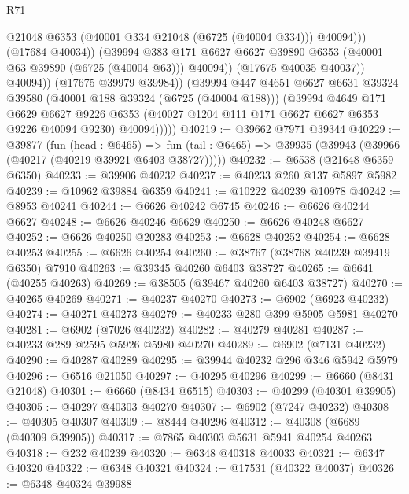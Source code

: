 \begin{lexlean}{R71}
\begin{coremodule}
                            @21048
                            @6353
                            (@40001 @334 @21048 (@6725 (@40004 @334)))
                            @40094)))
                      (@17684 @40034))
                    (@39994
                      @383
                      @171
                      @6627
                      @6627
                      @39890
                      @6353
                      (@40001 @63 @39890 (@6725 (@40004 @63)))
                      @40094))
                  (@17675 @40035 @40037))
                @40094))
            (@17675 @39979 @39984))
          (@39994
            @447
            @4651
            @6627
            @6631
            @39324
            @39580
            (@40001 @188 @39324 (@6725 (@40004 @188)))
            (@39994
              @4649
              @171
              @6629
              @6627
              @9226
              @6353
              (@40027 @1204 @111 @171 @6627 @6627 @6353 @9226 @40094 @9230)
              @40094)))))
@40219 := @39662 @7971 @39344
@40229 := @39877
    (fun (head : @6465) =>
    fun (tail : @6465) => @39935 (@39943 (@39966 (@40217 (@40219 @39921 @6403 @38727)))))
@40232 := @6538 (@21648 @6359 @6350)
@40233 := @39906 @40232
@40237 := @40233 @260 @137 @5897 @5982
@40239 := @10962 @39884 @6359
@40241 := @10222 @40239 @10978
@40242 := @8953 @40241
@40244 := @6626 @40242 @6745
@40246 := @6626 @40244 @6627
@40248 := @6626 @40246 @6629
@40250 := @6626 @40248 @6627
@40252 := @6626 @40250 @20283
@40253 := @6628 @40252
@40254 := @6628 @40253
@40255 := @6626 @40254
@40260 := @38767 (@38768 @40239 @39419 @6350) @7910
@40263 := @39345 @40260 @6403 @38727
@40265 := @6641 (@40255 @40263)
@40269 := @38505 (@39467 @40260 @6403 @38727)
@40270 := @40265 @40269
@40271 := @40237 @40270
@40273 := @6902 (@6923 @40232)
@40274 := @40271 @40273
@40279 := @40233 @280 @399 @5905 @5981 @40270
@40281 := @6902 (@7026 @40232)
@40282 := @40279 @40281
@40287 := @40233 @289 @2595 @5926 @5980 @40270
@40289 := @6902 (@7131 @40232)
@40290 := @40287 @40289
@40295 := @39944 @40232 @296 @346 @5942 @5979
@40296 := @6516 @21050
@40297 := @40295 @40296
@40299 := @6660 (@8431 @21048)
@40301 := @6660 (@8434 @6515)
@40303 := @40299 (@40301 @39905)
@40305 := @40297 @40303 @40270
@40307 := @6902 (@7247 @40232)
@40308 := @40305 @40307
@40309 := @8444 @40296
@40312 := @40308 (@6689 (@40309 @39905))
@40317 := @7865 @40303 @5631 @5941 @40254 @40263
@40318 := @232 @40239
@40320 := @6348 @40318 @40033
@40321 := @6347 @40320
@40322 := @6348 @40321
@40324 := @17531 (@40322 @40037)
@40326 := @6348 @40324 @39988

\end{coremodule}
\end{lexlean}
